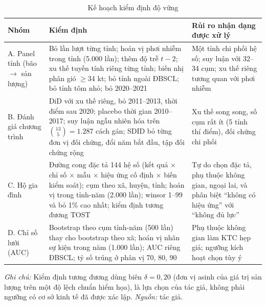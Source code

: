 \documentclass[12pt,a4paper]{article}
\begin{document}
\begin{table}[!tbp]
\centering\footnotesize
\caption{Kế hoạch kiểm định độ vững}
\label{tab:robustplan}
\begin{tabularx}{\textwidth}{@{}>{\raggedright\arraybackslash}p{2.6cm}>{\raggedright\arraybackslash}X>{\raggedright\arraybackslash}X@{}}
\toprule
Nhóm & Kiểm định & Rủi ro nhận dạng được xử lý \\
\midrule
A. Panel tỉnh (bão $\to$ sản lượng) & Bỏ lần lượt từng tỉnh; hoán vị phơi nhiễm trong tỉnh (5.000 lần); thêm độ trễ $t-2$; xu thế tuyến tính riêng từng tỉnh; biến nhị phân gió $\geq$34 kt; bỏ tỉnh ngoài ĐBSCL; bỏ tỉnh tôm nhỏ; bỏ 2020--2021 & Một tỉnh chi phối hệ số; suy luận với 32--34 cụm; xu thế riêng tương quan với phơi nhiễm \\
B. Đánh giá chương trình & DiD với xu thế riêng, bỏ 2011--2013, thời điểm sau 2020; placebo thời gian 2010--2017; suy luận ngẫu nhiên hóa trên $\binom{13}{5}=1.287$ cách gán; SDID bỏ từng đơn vị đối chứng, đổi năm bắt đầu, tập đối chứng rộng & Xu thế song song, số cụm rất ít (5 tỉnh thí điểm), đối chứng chi phối \\
C. Hộ gia đình & Đường cong đặc tả 144 hệ số (kết quả $\times$ chỉ số $\times$ mẫu $\times$ hiệu ứng cố định $\times$ biến kiểm soát); cụm theo xã, huyện, tỉnh; hoán vị trong tỉnh-năm (2.000 lần); winsor 1--99 và bỏ 1\% cao nhất; kiểm định tương đương TOST & Tự do chọn đặc tả, phụ thuộc không gian, ngoại lai, và phân biệt ``không có hiệu ứng'' với ``không đủ lực'' \\
D. Chỉ số lưới (AUC) & Bootstrap theo cụm tỉnh-năm (500 lần) thay cho bootstrap theo xã; hoán vị nhãn sự kiện trong năm (1.000 lần); AUC riêng ĐBSCL; tỷ số trúng ở phân vị 70, 80, 90 & Phụ thuộc không gian làm KTC hẹp giả; ngưỡng kích hoạt chọn tùy ý \\
\bottomrule
\end{tabularx}
\begin{minipage}{\textwidth}\footnotesize
\textit{Ghi chú:} Kiểm định tương đương dùng biên $\delta = 0{,}20$ (đơn vị asinh của giá trị sản lượng trên một độ lệch chuẩn hiểm họa), là lựa chọn của tác giả, không phải ngưỡng có cơ sở kinh tế đã được xác lập. \textit{Nguồn:} tác giả.
\end{minipage}
\end{table}
\end{document}
